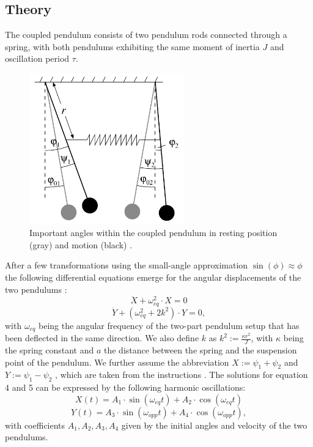 \documentclass{article}
\begin{document}
\subsection{Theory}
The coupled pendulum consists of two pendulum rods connected through a spring, with both pendulums exhibiting the same moment of inertia $J$ and oscillation period $\tau$.
\begin{figure}[hbt!]
\centering
\includegraphics[width=190pt]{coupled.png}
\caption{Important angles within the coupled pendulum in resting position (gray) and motion (black) \cite{1}.}
\end{figure}
After a few transformations using the small-angle approximation $\sin(\phi) \approx \phi$ the following differential equations emerge for the angular displacements of the two pendulums \cite{1}:
\begin{equation}
    \ddot{X} + \omega_{eq}^2 \cdot X = 0
\end{equation}
\begin{equation}
    \ddot{Y} + (\omega_{eq}^2 +2k^2) \cdot Y = 0,
\end{equation}
with $\omega_{eq}$ being the angular frequency of the two-part pendulum setup that has been deflected in the same direction. We also define $k$ as $k^2 := \frac{\kappa r^2}{J}$, with $\kappa$ being the spring constant and $a$ the distance between the spring and the suspension point of the pendulum.
We further assume the abbreviation $X:= \psi_1 + \psi_2$ and $Y:= \psi_1 - \psi_2$ , which are taken from the instructions \cite{1}. The solutions for equation 4 and 5 can be expressed by the following harmonic oscillations:
\begin{equation}
    X(t) = A_1 \cdot \sin(\omega_{eq}t) + A_2 \cdot \cos(\omega_{eq}t)
\end{equation}
\begin{equation}
    Y(t) = A_3 \cdot \sin(\omega_{opp}t) + A_4 \cdot \cos(\omega_{opp}t),
\end{equation}
with coefficients $A_1,A_2,A_3,A_4$ given by the initial angles and velocity of the two pendulums. 
\end{document}
